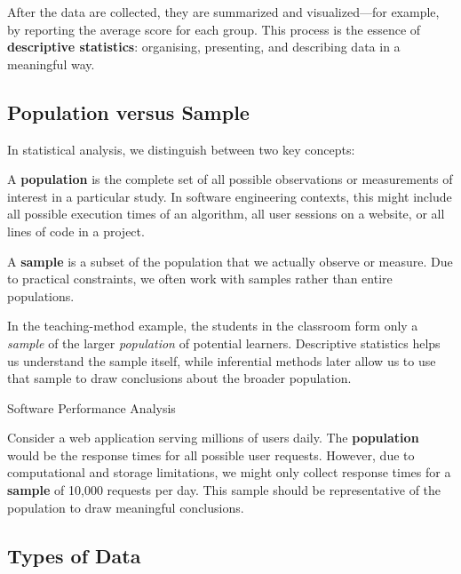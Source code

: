 After the data are collected, they are summarized and visualized—for example, by reporting the average score for each group. This process is the essence of \textbf{descriptive statistics}: organising, presenting, and describing data in a meaningful way.  

\subsection*{Population versus Sample}

In statistical analysis, we distinguish between two key concepts:

\begin{definition}[Population]
A \textbf{population} is the complete set of all possible observations or measurements of interest in a particular study. In software engineering contexts, this might include all possible execution times of an algorithm, all user sessions on a website, or all lines of code in a project.
\end{definition}

\begin{definition}[Sample]
A \textbf{sample} is a subset of the population that we actually observe or measure. Due to practical constraints, we often work with samples rather than entire populations.
\end{definition}

In the teaching-method example, the students in the classroom form only a \emph{sample} of the larger \emph{population} of potential learners. Descriptive statistics helps us understand the sample itself, while inferential methods later allow us to use that sample to draw conclusions about the broader population.


\begin{example} Software Performance Analysis

Consider a web application serving millions of users daily. The \textbf{population} would be the response times for all possible user requests. However, due to computational and storage limitations, we might only collect response times for a \textbf{sample} of 10,000 requests per day. This sample should be representative of the population to draw meaningful conclusions.
\end{example}

\subsection*{Types of Data}

